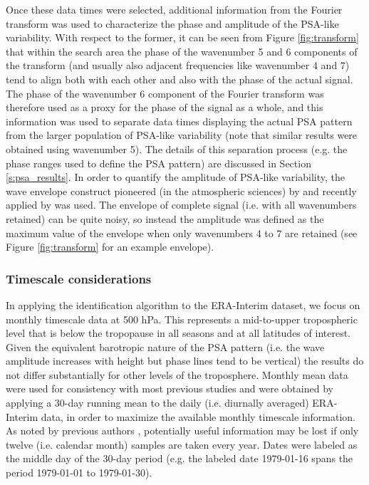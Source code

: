 Once these data times were selected, additional information from the Fourier transform was used to characterize the phase and amplitude of the PSA-like variability. With respect to the former, it can be seen from Figure \ref{fig:transform} that within the search area the phase of the wavenumber 5 and 6 components of the transform (and usually also adjacent frequencies like wavenumber 4 and 7) tend to align both with each other and also with the phase of the actual signal. The phase of the wavenumber 6 component of the Fourier transform was therefore used as a proxy for the phase of the signal as a whole, and this information was used to separate data times displaying the actual PSA pattern from the larger population of PSA-like variability (note that similar results were obtained using wavenumber 5). The details of this separation process (e.g. the phase ranges used to define the PSA pattern) are discussed in Section \ref{s:psa_results}.  In order to quantify the amplitude of PSA-like variability, the wave envelope construct pioneered (in the atmospheric sciences) by \citet{Zimin2003} and recently applied by \citet{IrvingSimmonds2015} was used. The envelope of complete signal (i.e. with all wavenumbers retained) can be quite noisy, so instead the amplitude was defined as the maximum value of the envelope when only wavenumbers 4 to 7 are retained (see Figure \ref{fig:transform} for an example envelope).

\subsubsection{Timescale considerations}

In applying the identification algorithm to the ERA-Interim dataset, we focus on monthly timescale data at 500 hPa. This represents a mid-to-upper tropospheric level that is below the tropopause in all seasons and at all latitudes of interest. Given the equivalent barotropic nature of the PSA pattern (i.e. the wave amplitude increases with height but phase lines tend to be vertical) the results do not differ substantially for other levels of the troposphere. Monthly mean data were used for consistency with most previous studies and were obtained by applying a 30-day running mean to the daily (i.e. diurnally averaged) ERA-Interim data, in order to maximize the available monthly timescale information. As noted by previous authors \citep[e.g.][]{Kidson1988}, potentially useful information may be lost if only twelve (i.e. calendar month) samples are taken every year. Dates were labeled as the middle day of the 30-day period (e.g. the labeled date 1979-01-16 spans the period 1979-01-01 to 1979-01-30).

